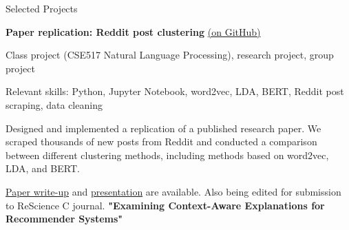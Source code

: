 \begin{rubric}{Selected Projects}

	\textbf{Paper replication: Reddit post clustering} \href{https://github.com/cephcyn/cse517project}{(on GitHub)}
	\par Class project (CSE517 Natural Language Processing), research project, group project
	\par Relevant skills: Python, Jupyter Notebook, word2vec, LDA, BERT, Reddit post scraping, data cleaning
	\par Designed and implemented a replication of a published research paper. We scraped thousands of new posts from Reddit and conducted a comparison between different clustering methods, including methods based on word2vec, LDA, and BERT.
	\par \href{https://github.com/cephcyn/cephcyn.github.io/raw/master/documents/u_cse517/final_writeup.pdf}{Paper write-up} and \href{https://www.youtube.com/watch?v=SgzpiQQEeEU}{presentation} are available. Also being edited for submission to ReScience C journal.
\entry*[2020] %
	\textbf{"Examining Context-Aware Explanations for Recommender Systems"}

\end{rubric}
